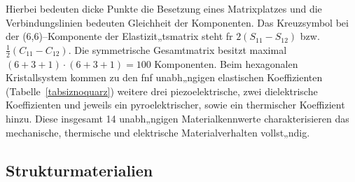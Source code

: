 Hierbei bedeuten dicke Punkte die Besetzung eines
Matrixplatzes und die Verbindungslinien bedeuten Gleichheit der
Komponenten.  Das Kreuzsymbol bei der (6,6)--Komponente der
Elastizit„tsmatrix steht fr $2(S_{11} - S_{12})$ bzw.\
$ \frac{1}{2} (C_{11} - C_{12}) $. Die symmetrische Gesamtmatrix
besitzt maximal $ (6+3+1) \cdot (6+3+1) = 100 $ Komponenten.
Beim hexagonalen Kristallsystem kommen zu den fnf unabh„ngigen
elastischen Koeffizienten (Tabelle~\ref{tabsiznoquarz}) weitere drei
piezoelektrische, zwei dielektrische Koeffizienten und jeweils ein
pyroelektrischer, sowie ein thermischer Koeffizient hinzu. Diese
insgesamt 14 unabh„ngigen Materialkennwerte
charakterisieren das mechanische, thermische und elektrische
Materialverhalten vollst„ndig.


\subsection{Strukturmaterialien}
\label{substratmaterialien}

